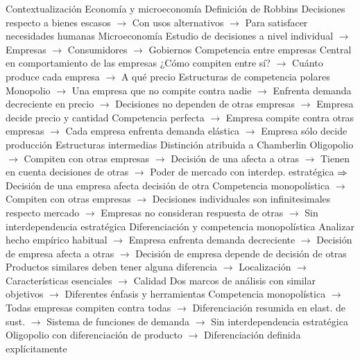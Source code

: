 \documentclass{nuevotema}
\begin{document}
\esquemalargo

\begin{esquemal}
	\1[] 
		\2 Contextualización
			\3 Economía y microeconomía
				\4 Definición de Robbins
				\4[] Decisiones respecto a bienes escasos
				\4[] $\to$ Con usos alternativos
				\4[] $\to$ Para satisfacer necesidades humanas
				\4 Microeconomía
				\4[] Estudio de decisiones a nivel individual
				\4[] $\to$ Empresas
				\4[] $\to$ Consumidores
				\4[] $\to$ Gobiernos
			\3 Competencia entre empresas
				\4 Central en comportamiento de las empresas
				\4 ¿Cómo compiten entre sí?
				\4[] $\to$ Cuánto produce cada empresa
				\4[] $\to$ A qué precio
				\4 Estructuras de competencia polares
				\4[] Monopolio
				\4[] $\to$ Una empresa que no compite contra nadie
				\4[] $\to$ Enfrenta demanda decreciente en precio
				\4[] $\to$ Decisiones no dependen de otras empresas
				\4[] $\to$ Empresa decide precio y cantidad
				\4[] Competencia perfecta
				\4[] $\to$ Empresa compite contra otras empresas
				\4[] $\to$ Cada empresa enfrenta demanda elástica
				\4[] $\to$ Empresa sólo decide producción
				\4 Estructuras intermedias
				\4[] Distinción atribuida a Chamberlin
				\4[] Oligopolio
				\4[] $\to$ Compiten con otras empresas
				\4[] $\to$ Decisión de una afecta a otras
				\4[] $\to$ Tienen en cuenta decisiones de otras
				\4[] $\to$ Poder de mercado con interdep. estratégica
				\4[] $\Rightarrow$ Decisión de una empresa afecta decisión de otra
				\4[] Competencia monopolística
				\4[] $\to$ Compiten con otras empresas
				\4[] $\to$ Decisiones individuales son infinitesimales respecto mercado
				\4[] $\to$ Empresas no consideran respuesta de otras
				\4[] $\to$ Sin interdependencia estratégica
			\3 Diferenciación y competencia monopolística
				\4 Analizar hecho empírico habitual
				\4[] $\to$ Empresa enfrenta demanda decreciente
				\4[] $\to$ Decisión de empresa afecta a otras
				\4[] $\to$ Decisión de empresa depende de decisión de otras
				\4[] Productos similares deben tener alguna diferencia
				\4[] $\to$ Localización
				\4[] $\to$ Características esenciales
				\4[] $\to$ Calidad
				\4 Dos marcos de análisis con similar objetivos
				\4[] $\to$ Diferentes énfasis y herramientas
				\4[] Competencia monopolística
				\4[] $\to$ Todas empresas compiten contra todas
				\4[] $\to$ Diferenciación resumida en elast. de sust.
				\4[] $\to$ Sistema de funciones de demanda
				\4[] $\to$ Sin interdependencia estratégica
				\4[] Oligopolio con diferenciación de producto
				\4[] $\to$ Diferenciación definida explícitamente

\end{esquemal}
\end{document}
